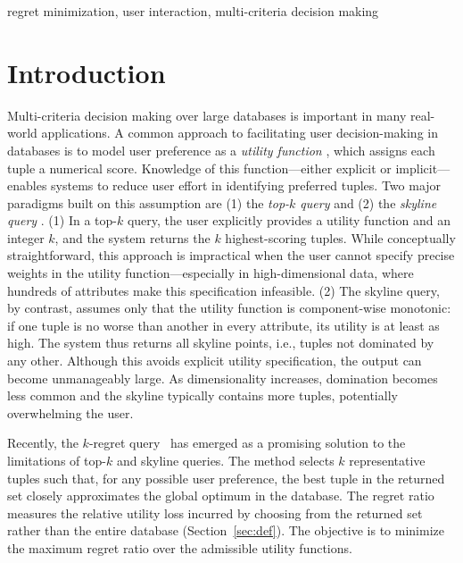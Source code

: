 \documentclass[conference]{IEEEtran}
\theoremstyle{definition}
\theoremstyle{plain}
\begin{document}
\begin{IEEEkeywords}
regret minimization, user interaction, multi-criteria decision making
\end{IEEEkeywords}


\section{Introduction}
\label{sec:intro}

Multi-criteria decision making over large databases is important in many real-world applications.
A common approach to facilitating user decision-making in databases is to model user preference as a \textit{utility function} \cite{CB00, NL12, NS10}, which assigns each tuple a numerical score. Knowledge of this function—either explicit or implicit—enables systems to reduce user effort in identifying preferred tuples. Two major paradigms built on this assumption are (1) the \emph{top-$k$ query} \cite{GY05, PL07, SI07, LYH09, LC09} and (2) the \emph{skyline query} \cite{CJ06, CJ062, LY07, MC09, PT05}.
(1) In a top-$k$ query, the user explicitly provides a utility function and an integer $k$, and the system returns the $k$ highest-scoring tuples. While conceptually straightforward, this approach is impractical when the user cannot specify precise weights in the utility function—especially in high-dimensional data, where hundreds of attributes make this specification infeasible.
(2) The skyline query, by contrast, assumes only that the utility function is component-wise monotonic: if one tuple is no worse than another in every attribute, its utility is at least as high. The system thus returns all skyline points, i.e., tuples not dominated by any other. Although this avoids explicit utility specification, the output can become unmanageably large. As dimensionality increases, domination becomes less common and the skyline typically contains more tuples, potentially overwhelming the user.

Recently, the $k$-regret query~\cite{AK17, asudeh2017efficient, NS10, PW14, XW18} has emerged as a promising solution to the limitations of top-$k$ and skyline queries. The method selects $k$ representative tuples such that, for any possible user preference, the best tuple in the returned set closely approximates the global optimum in the database. The regret ratio measures the relative utility loss incurred by choosing from the returned set rather than the entire database (Section~\ref{sec:def}). The objective is to minimize the maximum regret ratio over the admissible utility functions.
\end{document}
